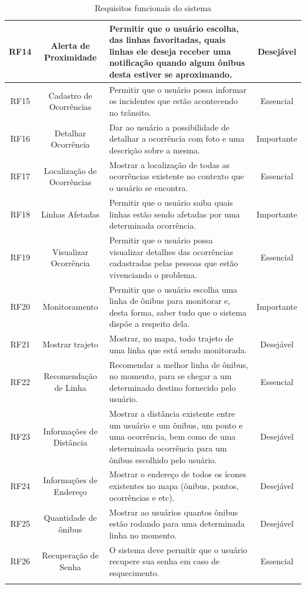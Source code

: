 \begin{center}
\begin{longtable}{c|c|p{8cm}|c}
\hline
    RF14  & Alerta de Proximidade & Permitir que o usuário escolha, das linhas favoritadas, quais linhas ele deseja receber uma notificação quando algum ônibus desta estiver se aproximando. & Desejável \\
\hline
    RF15  & Cadastro de Ocorrências & Permitir que o usuário possa informar os incidentes que estão acontecendo no trânsito. & Essencial \\
\hline
    RF16  & Detalhar Ocorrência & Dar ao usuário a possibilidade de detalhar a ocorrência com foto e uma descrição sobre a mesma. & Importante \\
\hline
    RF17  & Localização de Ocorrências & Mostrar a localização de todas as ocorrências existente no contexto que o usuário se encontra.   & Essencial \\
\hline
    RF18  & Linhas Afetadas & Permitir que o usuário saiba quais linhas estão sendo afetadas por uma determinada ocorrência. & Importante \\
\hline
    RF19  & Visualizar Ocorrência & Permitir que o usuário possa visualizar detalhes das ocorrências cadastradas pelas pessoas que estão vivenciando o problema. & Essencial \\
\hline
    RF20  & Monitoramento & Permitir que o usuário escolha uma linha de ônibus para monitorar e, desta forma, saber tudo que o sistema dispõe a respeito dela. & Importante \\
\hline
    RF21  & Mostrar trajeto & Mostrar, no mapa, todo trajeto de uma linha que está sendo monitorada. & Desejável \\
\hline
    RF22  & Recomendação de Linha & Recomendar a melhor linha de ônibus, no momento, para se chegar a um determinado destino fornecido pelo usuário. & Essencial \\
    \hline
    RF23  & Informações de Distância & Mostrar a distância existente entre um usuário e um ônibus, um ponto e uma ocorrência, bem como de uma determinada ocorrência para um ônibus escolhido pelo usuário. & Desejável \\
\hline
    RF24  & Informações de Endereço & Mostrar o endereço de todos os ícones existentes no mapa (ônibus, pontos, ocorrências e etc). & Desejável \\
\hline
   RF25 & Quantidade de ônibus & Mostrar ao usuários quantos ônibus estão rodando para uma determinada linha no momento. & Desejável\\
   \hline
    RF26 & Recuperação de Senha & O sistema deve permitir que o usuário recupere sua senha em caso de esquecimento. & Essencial\\
\hline
\caption{Requisitos funcionais do sistema}
\end{longtable}
\end{center}



